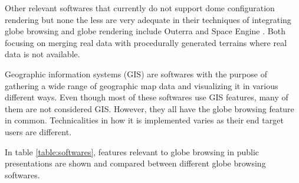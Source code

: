Other relevant softwares that currently do not support dome configuration rendering but none the less are very adequate in their techniques of integrating globe browsing and globe rendering include Outerra \cite{outerra} and Space Engine \cite{spaceengine}. Both focusing on merging real data with procedurally generated terrains where real data is not available.

Geographic information systems (GIS) are softwares with the purpose of gathering a wide range of geographic map data and visualizing it in various different ways. Even though most of these softwares use GIS features, many of them are not considered GIS. However, they all have the globe browsing feature in common. Technicalities in how it is implemented varies as their end target users are different.

In table \ref{table:softwares}, features relevant to globe browsing in public presentations are shown and compared between different globe browsing softwares.

\begin{center}
  \begin{table}
  \caption[]{Relevant features of different globe browsing softwares}
    \label{table:softwares}
  \end{table}
\end{center}

